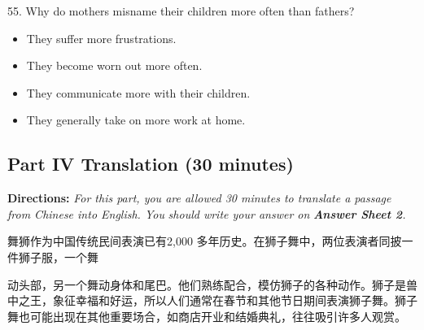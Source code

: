 \documentclass[UTF8,11pt]{ctexart}
\begin{document}
55. Why do mothers misname their children more often than fathers?


\begin{itemize}[leftmargin=2em,itemsep=.2em,topsep=.4em]\item[A.] They suffer more frustrations.
\item[B.] They become worn out more often.
\item[C.] They communicate more with their children.
\item[D.] They generally take on more work at home.
\end{itemize}

\subsection*{\textbf{Part} IV \textbf{Translation} \textbf{(30 minutes)}}


\textbf{Directions:}\textit{ For this part, you are allowed 30 minutes to translate a passage from Chinese into English. You} \textit{should write your answer on}\textbf{\textit{ Answer Sheet 2}}\textit{.}


舞狮作为中国传统民间表演已有2,000 多年历史。在狮子舞中，两位表演者同披一件狮子服，一个舞


动头部，另一个舞动身体和尾巴。他们熟练配合，模仿狮子的各种动作。狮子是兽中之王，象征幸福和好运，所以人们通常在春节和其他节日期间表演狮子舞。狮子舞也可能出现在其他重要场合，如商店开业和结婚典礼，往往吸引许多人观赏。
\end{document}
